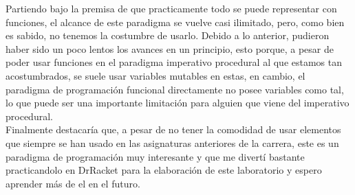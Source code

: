 Partiendo bajo la premisa de que practicamente todo se puede representar con funciones, el alcance 
de este paradigma se vuelve casi ilimitado, pero, como bien es sabido, no tenemos la costumbre de usarlo. 
Debido a lo anterior, pudieron haber sido un poco lentos los avances en un principio, esto porque, a pesar de poder usar 
funciones en el paradigma imperativo procedural al que estamos tan acostumbrados, se suele usar variables mutables en estas, en cambio, el paradigma 
de programación funcional directamente no posee variables como tal, lo que puede ser una importante limitación para 
alguien que viene del imperativo procedural.\\

Finalmente destacaría que, a pesar de no tener la comodidad de usar elementos que siempre se han usado en las asignaturas anteriores de la carrera, este 
es un paradigma de programación muy interesante y que me divertí bastante practicandolo en DrRacket para la elaboración de este laboratorio y espero 
aprender más de el en el futuro.